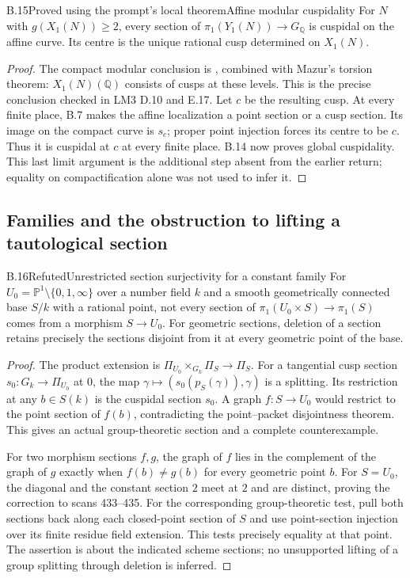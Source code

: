 \begin{statement}{B.15}{Proved using the prompt's local theorem}{Affine modular cuspidality}
For $N$ with $g(X_1(N))\geq2$, every section of
$\pi_1(Y_1(N))\to G_{\mathbb Q}$ is cuspidal on the affine curve.
Its centre is the unique rational cusp determined on $X_1(N)$.
\end{statement}
\begin{proof}
The compact modular conclusion is
\cite[Corollary 8.5]{B_OpenAIPadic}, combined with Mazur's torsion
theorem: $X_1(N)(\mathbb Q)$ consists of cusps at these levels.
This is the precise conclusion checked in LM3 D.10 and E.17.
Let $c$ be the resulting cusp.  At every finite place, B.7 makes
the affine localization a point section or a cusp section.
Its image on the compact curve is $s_c$; proper point injection
forces its centre to be $c$.  Thus it is cuspidal at $c$ at every
finite place.  B.14 now proves global cuspidality.
This last limit argument is the additional step absent from the
earlier return; equality on compactification alone was not used to
infer it.
\end{proof}

\subsection{Families and the obstruction to lifting a tautological section}

\begin{statement}{B.16}{Refuted}{Unrestricted section surjectivity for a constant family}
For $U_0=\mathbb P^1\setminus\{0,1,\infty\}$ over a number field $k$
and a smooth geometrically connected base $S/k$ with a rational
point, not every section of
$\pi_1(U_0\times S)\to\pi_1(S)$ comes from a morphism $S\to U_0$.
For geometric sections, deletion of a section retains precisely the
sections disjoint from it at every geometric point of the base.
\end{statement}
\begin{proof}
The product extension is
$\Pi_{U_0}\times_{G_k}\Pi_S\to\Pi_S$.
For a tangential cusp section $s_0:G_k\to\Pi_{U_0}$ at $0$, the map
$\gamma\mapsto(s_0(p_S(\gamma)),\gamma)$ is a splitting.
Its restriction at any $b\in S(k)$ is the cuspidal section $s_0$.
A graph $f:S\to U_0$ would restrict to the point section of $f(b)$,
contradicting the point--packet disjointness theorem.  This gives
an actual group-theoretic section and a complete counterexample.

For two morphism sections $f,g$, the graph of $f$ lies in the complement
of the graph of $g$ exactly when $f(b)\ne g(b)$ for every geometric
point $b$.  For $S=U_0$, the diagonal and the constant section $2$
meet at $2$ and are distinct, proving the correction to scans
433--435.  For the corresponding group-theoretic test, pull both
sections back along each closed-point section of $S$ and use
point-section injection over its finite residue field extension.
This tests precisely equality at that point.  The assertion is
about the indicated scheme sections; no unsupported lifting of a
group splitting through deletion is inferred.
\end{proof}

